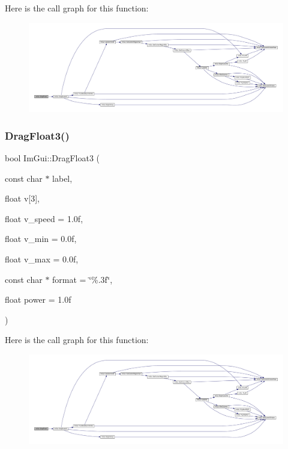 Here is the call graph for this function\+:
\nopagebreak
\begin{figure}[H]
\begin{center}
\leavevmode
\includegraphics[width=350pt]{namespace_im_gui_acabf4e1f3f5d878e88591424623526e9_cgraph}
\end{center}
\end{figure}
\mbox{\label{namespace_im_gui_a9de2c920447597c0b087d8261a0c34b7}} 
\subsubsection{\texorpdfstring{Drag\+Float3()}{DragFloat3()}}
{\footnotesize\ttfamily bool Im\+Gui\+::\+Drag\+Float3 (\begin{DoxyParamCaption}\item[{const char $\ast$}]{label,  }\item[{float}]{v\mbox{[}3\mbox{]},  }\item[{float}]{v\+\_\+speed = {\ttfamily 1.0f},  }\item[{float}]{v\+\_\+min = {\ttfamily 0.0f},  }\item[{float}]{v\+\_\+max = {\ttfamily 0.0f},  }\item[{const char $\ast$}]{format = {\ttfamily \char`\"{}\%.3f\char`\"{}},  }\item[{float}]{power = {\ttfamily 1.0f} }\end{DoxyParamCaption})}

Here is the call graph for this function\+:
\nopagebreak
\begin{figure}[H]
\begin{center}
\leavevmode
\includegraphics[width=350pt]{namespace_im_gui_a9de2c920447597c0b087d8261a0c34b7_cgraph}
\end{center}
\end{figure}
\mbox{\label{namespace_im_gui_a091e461705a8f49156f44e08ba29ced1}} 

